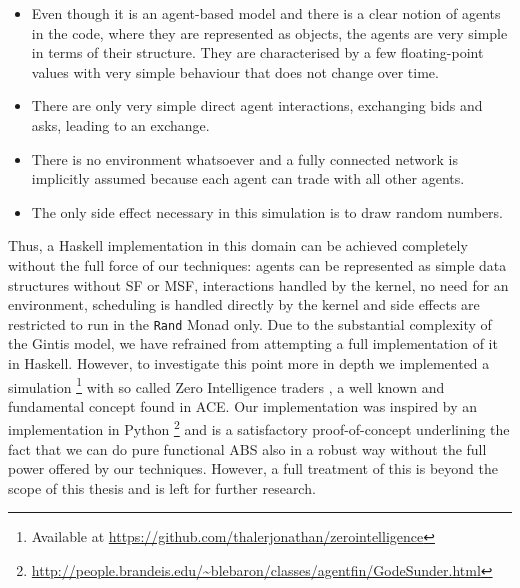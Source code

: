 \begin{itemize}
	\item Even though it is an agent-based model and there is a clear notion of agents in the code, where they are represented as objects, the agents are very simple in terms of their structure. They are characterised by a few floating-point values with very simple behaviour that does not change over time.

	\item There are only very simple direct agent interactions, exchanging bids and asks, leading to an exchange.

	\item There is no environment whatsoever and a fully connected network is implicitly assumed because each agent can trade with all other agents.
	
	\item The only side effect necessary in this simulation is to draw random numbers.
\end{itemize}

Thus, a Haskell implementation in this domain can be achieved completely without the full force of our techniques: agents can be represented as simple data structures without SF or MSF, interactions handled by the kernel, no need for an environment, scheduling is handled directly by the kernel and side effects are restricted to run in the \texttt{Rand} Monad only. Due to the substantial complexity of the Gintis model, we have refrained from attempting a full implementation of it in Haskell. However, to investigate this point more in depth we implemented a simulation \footnote{Available at \url{https://github.com/thalerjonathan/zerointelligence}} with so called Zero Intelligence traders \cite{gode_allocative_1993}, a well known and fundamental concept found in ACE. Our implementation was inspired by an implementation in Python \footnote{\url{http://people.brandeis.edu/~blebaron/classes/agentfin/GodeSunder.html}} and is a satisfactory proof-of-concept underlining the fact that we can do pure functional ABS also in a robust way without the full power offered by our techniques. However, a full treatment of this is beyond the scope of this thesis and is left for further research.

